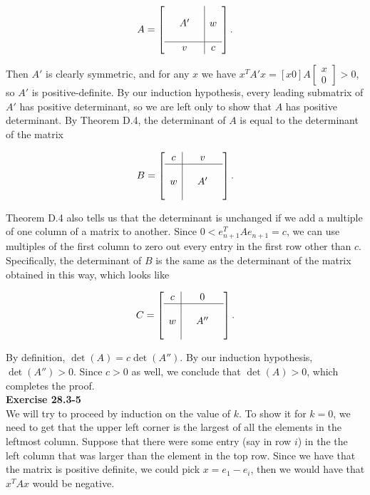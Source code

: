 \documentclass{article}
\begin{document}
\[A = \left[ \begin{array}{ccc|c} & & & \\  & A' & & w \\ & & & \\ \hline & v & & c\end{array} \right]. \]

Then $A'$ is clearly symmetric, and for any $x$ we have $x^T A' x = [x 0] A \left[ \begin{array}{c} x \\ 0 \end{array} \right] > 0$, so $A'$ is positive-definite.  By our induction hypothesis, every leading submatrix of $A'$ has positive determinant, so we are left only to show that $A$ has positive determinant.  By Theorem D.4, the determinant of $A$ is equal to the determinant of the matrix 

\[ B = \left[ \begin{array}{c|ccc}  c &  & v & \\ \hline & & & \\  w & & A' &  \\ & &  & \\ \end{array} \right]. \]

Theorem D.4 also tells us that  the determinant is unchanged if we add a multiple of one column of a matrix to another.  Since $0 < e_{n+1}^T A e_{n+1} = c$, we can use multiples of the first column to zero out every entry in the first row other than $c$.  Specifically, the determinant of $B$ is the same as the determinant of the matrix obtained in this way, which looks like

\[C = \left[ \begin{array}{c|ccc}  c &  & 0 & \\ \hline & & & \\  w & & A'' &  \\ & &  & \\ \end{array} \right]. \]

By definition, $\det(A) = c\det(A'')$.  By our induction hypothesis, $\det(A'') > 0$.  Since $c > 0$ as well, we conclude that $\det(A) > 0$, which completes the proof. \\

\noindent\textbf{Exercise 28.3-5}\\

We will try to proceed by induction on the value of $k$. To show it for $k=0$, we need to get that the upper left corner is the largest of all the elements in the leftmost column. Suppose that there were some entry (say in row $i$) in the the left column that was larger than the element in the top row. Since we have that the matrix is positive definite, we could pick $x = e_1 -  e_i$, then we would have that $x^T A x$ would be negative. \\
\end{document}
